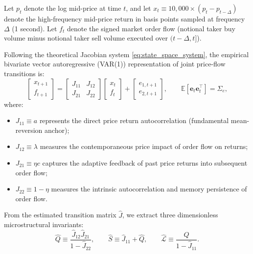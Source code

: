 \documentclass[12pt]{article}
\theoremstyle{definition}
\theoremstyle{remark}
\newcommand{\E}{\mathbb{E}}
\begin{document}
Let $p_t$ denote the log mid-price at time $t$, and let $x_t \equiv 10{,}000 \times (p_t - p_{t-\Delta})$ denote the high-frequency mid-price return in basis points sampled at frequency $\Delta$ (1 second). Let $f_t$ denote the signed market order flow (notional taker buy volume minus notional taker sell volume executed over $(t-\Delta, t]$).

Following the theoretical Jacobian system \eqref{eq:state_space_system}, the empirical bivariate vector autoregressive (VAR(1)) representation of joint price-flow transitions is:
\begin{equation}
\begin{bmatrix} x_{t+1} \\ f_{t+1} \end{bmatrix} = \begin{bmatrix} J_{11} & J_{12} \\ J_{21} & J_{22} \end{bmatrix} \begin{bmatrix} x_t \\ f_t \end{bmatrix} + \begin{bmatrix} e_{1, t+1} \\ e_{2, t+1} \end{bmatrix}, \qquad \E[\mathbf{e}_t \mathbf{e}_t^\top] = \Sigma_e,
\label{eq:bivariate_var}
\end{equation}
where:
\begin{itemize}
    \item $J_{11} \equiv a$ represents the direct price return autocorrelation (fundamental mean-reversion anchor);
    \item $J_{12} \equiv \lambda$ measures the contemporaneous price impact of order flow on returns;
    \item $J_{21} \equiv \eta c$ captures the adaptive feedback of past price returns into subsequent order flow;
    \item $J_{22} \equiv 1 - \eta$ measures the intrinsic autocorrelation and memory persistence of order flow.
\end{itemize}

From the estimated transition matrix $\hat{J}$, we extract three dimensionless microstructural invariants:
\begin{equation}
\hat{Q} \equiv \frac{\hat{J}_{12} \hat{J}_{21}}{1 - \hat{J}_{22}}, \qquad \hat{S} \equiv \hat{J}_{11} + \hat{Q}, \qquad \hat{\mathcal{L}} \equiv \frac{\hat{Q}}{1 - \hat{J}_{11}}.
\label{eq:dimensionless_invariants}
\end{equation}
\end{document}
